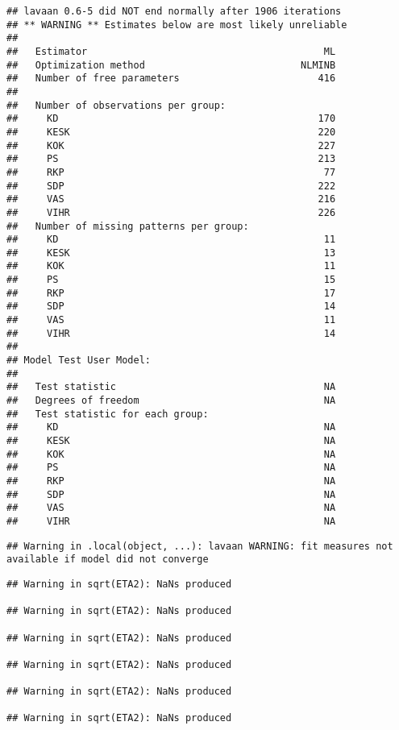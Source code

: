 \documentclass[
]{article}
\begin{document}
\begin{verbatim}
## lavaan 0.6-5 did NOT end normally after 1906 iterations
## ** WARNING ** Estimates below are most likely unreliable
## 
##   Estimator                                         ML
##   Optimization method                           NLMINB
##   Number of free parameters                        416
##                                                       
##   Number of observations per group:                   
##     KD                                             170
##     KESK                                           220
##     KOK                                            227
##     PS                                             213
##     RKP                                             77
##     SDP                                            222
##     VAS                                            216
##     VIHR                                           226
##   Number of missing patterns per group:               
##     KD                                              11
##     KESK                                            13
##     KOK                                             11
##     PS                                              15
##     RKP                                             17
##     SDP                                             14
##     VAS                                             11
##     VIHR                                            14
##                                                       
## Model Test User Model:
##                                                       
##   Test statistic                                    NA
##   Degrees of freedom                                NA
##   Test statistic for each group:
##     KD                                              NA
##     KESK                                            NA
##     KOK                                             NA
##     PS                                              NA
##     RKP                                             NA
##     SDP                                             NA
##     VAS                                             NA
##     VIHR                                            NA
\end{verbatim}

\begin{verbatim}
## Warning in .local(object, ...): lavaan WARNING: fit measures not available if model did not converge
\end{verbatim}

\begin{verbatim}
## Warning in sqrt(ETA2): NaNs produced

## Warning in sqrt(ETA2): NaNs produced

## Warning in sqrt(ETA2): NaNs produced

## Warning in sqrt(ETA2): NaNs produced

## Warning in sqrt(ETA2): NaNs produced

## Warning in sqrt(ETA2): NaNs produced
\end{verbatim}
\end{document}
